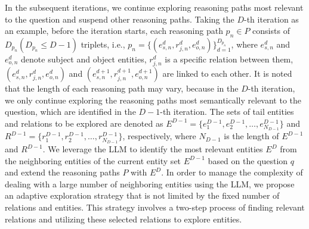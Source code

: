 \documentclass{article}
\begin{document}
In the subsequent iterations, we continue exploring reasoning paths most relevant to the question and suspend other reasoning paths.
Taking the $D$-th iteration as an example, before the iteration starts, each reasoning path $p_n \in P$ consists of $D_{p_n} (D_{p_n} \leq D - 1 )$ triplets, i.e., $p_n = \{(e^d_{s,n}, r^d_{j,n}, e^d_{o,n})\}_{d=1}^{D_{p_n}}$, where $e^d_{s,n}$ and $e^d_{o,n}$ denote subject and object entities, $r^d_{j,n}$ is a specific relation between them, $(e^d_{s,n}, r^d_{j,n}, e^d_{o,n})$ and $(e^{d+1}_{s,n}, r^{d+1}_{j,n}, e^{d+1}_{o,n})$ are linked to each other. 
It is noted that the length of each reasoning path may vary, because in the $D$-th iteration, we only continue exploring the reasoning paths most semantically relevant to the question, which are identified in the $D-1$-th iteration.
The sets of tail entities and relations to be explored are denoted as $E^{D-1} = \{e^{D-1}_1, e^{D-1}_2, \dots, e^{D-1}_{N_{D-1}}\}$ and $R^{D-1} = \{r^{D-1}_1, r^{D-1}_2, \dots, r^{D-1}_{N_{D-1}}\}$, respectively, where $N_{D-1}$ is the length of $E^{D-1}$ and $R^{D-1}$.
We leverage the LLM to identify the most relevant entities $E^D$ from the neighboring entities of the current entity set $E^{D-1}$ based on the question $q$ and extend the reasoning paths $P$ with $E^D$.
In order to manage the complexity of dealing with a large number of neighboring entities using the LLM, 
we propose an adaptive exploration strategy that is not limited by the fixed number of relations and entities. 
This strategy involves a two-step process of finding relevant relations and utilizing these selected relations to explore entities.
\end{document}
